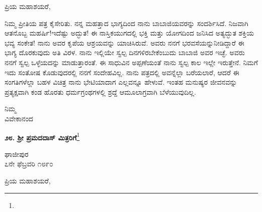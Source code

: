 \noindent
ಪ್ರಿಯ ಮಹಾಶಯರೆ,

ನಿಮ್ಮ ಪ್ರೀತಿಯ ಪತ್ರ ಕೈಸೇರಿತು. ನನ್ನ ಮಹತ್ತಾದ ಭಾಗ್ಯದಿಂದ ನಾನು ಬಾಬಾಜಿಯವರನ್ನು ಸಂದರ್ಶಿಸಿದೆ. ನಿಜವಾಗಿ ಆತನೊಬ್ಬ ಮಹರ್ಷಿ!ಇದೆಷ್ಟು ಅದ್ಭುತ! ಈ ನಾಸ್ತಿಕಯುಗದಲ್ಲಿ ಭಕ್ತಿ ಮತ್ತು ಯೋಗದಿಂದ ಜನಿಸಿದ ಅತ್ಯದ್ಭುತ ಶಕ್ತಿಯ ಭವ್ಯ ಸಂಕೇತ! ನಾನು ಅವರ ಕೃಪೆಯ ಆಶ್ರಯವನ್ನು ಯಾಚಿಸಿರುವೆ. ಅವರು ನನಗೆ ಭರವಸೆಯನ್ನು\break ನೀಡಿದ್ದಾರೆ\enginline{-} ಈ ಭಾಗ್ಯ ದೊರಕುವುದು ಅತಿ ವಿರಳ. ನಾನು ಇಲ್ಲಿಯೇ ಸ್ವಲ್ಪ ದಿನಗಳಿರಬೇಕೆಂಬುದು ಬಾಬಾಜಿ ಅವರ ಇಚ್ಛೆ. ಅವರು ನನಗೆ ಸ್ವಲ್ಪ ಒಳ್ಳೆಯದನ್ನು ಮಾಡುತ್ತಾರಂತೆ. ಈ ಸಾಧುವಿನ ಅಪ್ಪಣೆಯಂತೆ ನಾನು ಸ್ವಲ್ಪ ಕಾಲ ಇಲ್ಲೇ ಇರುತ್ತೇನೆ. ನಿಮಗೆ ಇದು ಸಂತೋಷ ಕೊಡುವುದರಲ್ಲಿ ನನಗೆ ಸಂದೇಹವಿಲ್ಲ. ನಾನು ಪತ್ರದಲ್ಲಿ ಅವನ್ನೆಲ್ಲಾ ಬರೆಯಲಾರೆ, ಆದರೆ ಈ ಸಂಗತಿಗಳೆಲ್ಲಾ ಬಹಳ ವಿಚಿತ್ರ \enginline{-} ನಾನು ಭೇಟಿಯಾದಾಗ ಎಲ್ಲವನ್ನೂ ಹೇಳುವೆ. ಇಂತಹ ಮನುಷ್ಯರ ಜೀವನವನ್ನು ಪ್ರತ್ಯಕ್ಷವಾಗಿ ಕಂಡ ಹೊರತು ಧರ್ಮಗ್ರಂಥಗಳಲ್ಲಿ ಶ್ರದ್ದೆ ಆಮೂಲಾಗ್ರವಾಗಿ ಬೆಳೆಯುವುದಿಲ್ಲ.

\vspace{-0.5cm}

{\flushright
ನಿಮ್ಮ\\ವಿವೇಕಾನಂದ\par}

\begin{center}
\textbf{೨೮. ಶ‍್ರೀ ಪ್ರಮದದಾಸ್ ಮಿತ್ರರಿಗೆ}\footnote{}
\end{center}
\vspace{-0.5cm}

\begin{flushright}
ಘಾಜೀಪುರ\\೭ನೇ ಫೆಬ್ರವರಿ ೧೮೯೦
\end{flushright}
\vspace{-0.5cm}

\noindent
ಪ್ರಿಯ ಮಹಾಶಯರೆ,

